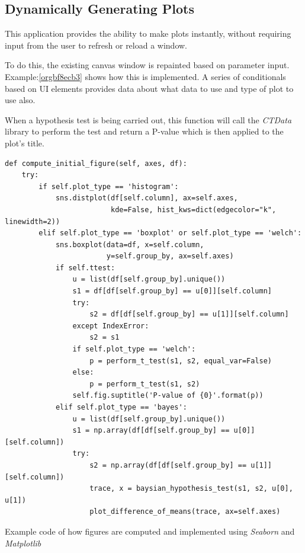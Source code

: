 \documentclass[11pt]{report}
\begin{document}
\subsection{Dynamically Generating Plots}
\label{sec:orgefa01cf}
This application provides the ability to make plots instantly, without requiring input from the user to refresh or reload a window.

To do this, the existing canvas window is repainted based on parameter input. Example:\ref{orgbf8ecb3}
shows how this is implemented. A series of conditionals based on UI elements provides data about what data to use and type of plot to use also.

When a hypothesis test is being carried out, this function will call the \emph{CTData} library to perform the test and return a P-value which is then applied to the plot's title.

\begin{listing}[htbp]
\begin{verbatim}
def compute_initial_figure(self, axes, df):
    try:
        if self.plot_type == 'histogram':
            sns.distplot(df[self.column], ax=self.axes,
                         kde=False, hist_kws=dict(edgecolor="k", linewidth=2))
        elif self.plot_type == 'boxplot' or self.plot_type == 'welch':
            sns.boxplot(data=df, x=self.column,
                        y=self.group_by, ax=self.axes)
            if self.ttest:
                u = list(df[self.group_by].unique())
                s1 = df[df[self.group_by] == u[0]][self.column]
                try:
                    s2 = df[df[self.group_by] == u[1]][self.column]
                except IndexError:
                    s2 = s1
                if self.plot_type == 'welch':
                    p = perform_t_test(s1, s2, equal_var=False)
                else:
                    p = perform_t_test(s1, s2)
                self.fig.suptitle('P-value of {0}'.format(p))
            elif self.plot_type == 'bayes':
                u = list(df[self.group_by].unique())
                s1 = np.array(df[df[self.group_by] == u[0]][self.column])
                try:
                    s2 = np.array(df[df[self.group_by] == u[1]][self.column])
                    trace, x = baysian_hypothesis_test(s1, s2, u[0], u[1])
                    plot_difference_of_means(trace, ax=self.axes)
\end{verbatim}
\caption{\label{orgbf8ecb3}
Example code of how figures are computed and implemented using \emph{Seaborn} and \emph{Matplotlib}}
\end{listing}
\end{document}
